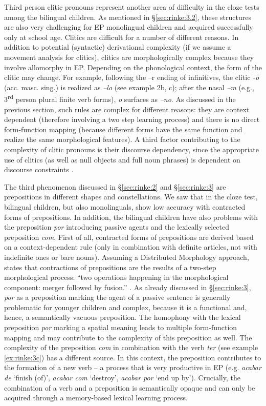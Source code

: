 \documentclass[output=paper]{langscibook}
\begin{document}
Third person clitic pronouns represent another area of difficulty in the cloze tests among the bilingual children. As mentioned in \S \ref{sec:rinke:3.2}, these structures are also very challenging for EP monolingual children and acquired successfully only at school age. Clitics are difficult for a number of different reasons. In addition to potential (syntactic) derivational complexity (if we assume a movement analysis for clitics), clitics are morphologically complex because they involve allomorphy in EP. Depending on the phonological context, the form of the clitic may change. For example, following the –r ending of infinitives, the clitic \textit{-o} (acc. masc. sing.) is realized as \textit{–lo} (see example 2b, c); after the nasal \textit{–m} (e.g., 3\textsuperscript{rd} person plural finite verb forms), \textit{o} surfaces as \textit{–no}. As discussed in the previous section, such rules are complex for different reasons: they are context dependent (therefore involving a two step learning process) and there is no direct form-function mapping (because different forms have the same function and realize the same morphological features). A third factor contributing to the complexity of clitic pronouns is their discourse dependency, since the appropriate use of clitics (as well as null objects and full noun phrases) is dependent on discourse constraints \citep{FloresSopata2020}. 

The third phenomenon discussed in \S \ref{sec:rinke:2} and \S \ref{sec:rinke:3} are prepositions in different shapes and constellations. We saw that in the cloze test, bilingual children, but also monolinguals, show low accuracy with contracted forms of prepositions. In addition, the bilingual children have also problems with the preposition \textit{por} introducing passive agents and the lexically selected preposition \textit{com}. First of all, contracted forms of prepositions are derived based on a context-dependent rule (only in combination with definite articles, not with indefinite ones or bare nouns). Assuming a Distributed Morphology approach, \citet{Ximenes2004} states that contractions of prepositions are the results of a two-step morphological process: “two operations happening in the morphological component: merger followed by fusion.” \citep[182]{Ximenes2004}. As already discussed in \S \ref{sec:rinke:3}, \textit{por} as a preposition marking the agent of a passive sentence is generally problematic for younger children and complex, because it is a functional and, hence, a semantically vacuous preposition. The homophony with the lexical preposition \textit{por} marking a spatial meaning leads to multiple form-function mapping and may contribute to the complexity of this preposition as well. The complexity of the preposition \textit{com} in combination with the verb \textit{ter} (see example \ref{ex:rinke:3c}) has a different source. In this context, the preposition contributes to the formation of a new verb – a process that is very productive in EP (e.g. \textit{acabar de} ‘finish (of)’, \textit{acabar com} ‘destroy’, \textit{acabar por} ‘end up by’). Crucially, the combination of a verb and a preposition is semantically opaque and can only be acquired through a memory-based lexical learning process.
\end{document}
